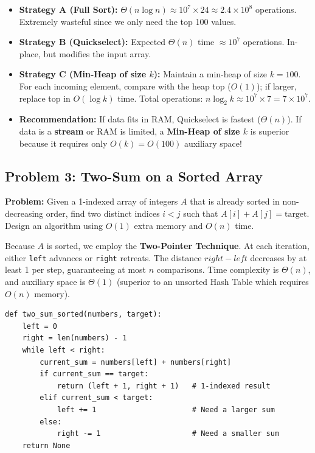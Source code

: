 \documentclass[11pt,a4paper]{article}
\begin{document}
\begin{definitionbox}
\begin{itemize}[itemsep=2pt]
    \item \textbf{Strategy A (Full Sort):} $\Theta(n \log n) \approx 10^7 \times 24 \approx 2.4 \times 10^8$ operations. Extremely wasteful since we only need the top 100 values.
    \item \textbf{Strategy B (Quickselect):} Expected $\Theta(n)$ time $\approx 10^7$ operations. In-place, but modifies the input array.
    \item \textbf{Strategy C (Min-Heap of size $k$):} Maintain a min-heap of size $k=100$. For each incoming element, compare with the heap top ($O(1)$); if larger, replace top in $O(\log k)$ time. Total operations: $n \log_2 k \approx 10^7 \times 7 = 7 \times 10^7$.
    \item \textbf{Recommendation:} If data fits in RAM, Quickselect is fastest ($\Theta(n)$). If data is a \textbf{stream} or RAM is limited, a \textbf{Min-Heap of size $k$} is superior because it requires only $O(k) = O(100)$ auxiliary space!
\end{itemize}
\end{definitionbox}

\subsection{Problem 3: Two-Sum on a Sorted Array}
\textbf{Problem:} Given a 1-indexed array of integers $A$ that is already sorted in non-decreasing order, find two distinct indices $i < j$ such that $A[i] + A[j] = \text{target}$. Design an algorithm using $O(1)$ extra memory and $O(n)$ time.

\begin{definitionbox}
Because $A$ is sorted, we employ the \textbf{Two-Pointer Technique}. At each iteration, either \lstinline{left} advances or \lstinline{right} retreats. The distance $right - left$ decreases by at least 1 per step, guaranteeing at most $n$ comparisons. Time complexity is $\Theta(n)$, and auxiliary space is $\Theta(1)$ (superior to an unsorted Hash Table which requires $O(n)$ memory).
\end{definitionbox}

\begin{lstlisting}[style=pythonstyle]
def two_sum_sorted(numbers, target):
    left = 0
    right = len(numbers) - 1
    while left < right:
        current_sum = numbers[left] + numbers[right]
        if current_sum == target:
            return (left + 1, right + 1)   # 1-indexed result
        elif current_sum < target:
            left += 1                      # Need a larger sum
        else:
            right -= 1                     # Need a smaller sum
    return None
\end{lstlisting}
\end{document}
